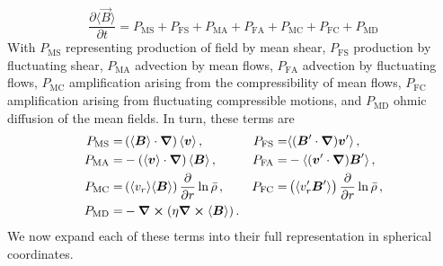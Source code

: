 \begin{equation}
  \label{eq:mean induction}
  \frac{\partial \langle \vec{B} \rangle }{\partial t} = P_\mathrm{MS} + P_\mathrm{FS} 
                                      + P_\mathrm{MA} + P_\mathrm{FA} 
				      + P_\mathrm{MC} + P_\mathrm{FC}
                                      + P_\mathrm{MD}
\end{equation}
With $P_\mathrm{MS}$ representing production of field by mean shear,
     $P_\mathrm{FS}$ production by fluctuating shear,
     $P_\mathrm{MA}$ advection by mean flows, 
     $P_\mathrm{FA}$ advection by fluctuating flows, 
     $P_\mathrm{MC}$ amplification arising from the compressibility of
     mean flows, $P_\mathrm{FC}$ amplification arising from
     fluctuating compressible motions, and 
     $P_\mathrm{MD}$ ohmic diffusion of the mean fields.  In turn,
     these terms are
\begin{align}\label{eq:mean terms}
  P_\mathrm{MS} =& \left( \langle \BB \rangle \cdot\nab \right)\langle \VV \rangle\thinspace, & %
  P_\mathrm{FS} =& \langle (\vec{B}'\cdot\nab)\vec{v}' \rangle\thinspace, \notag \\
  P_\mathrm{MA} =& -\left( \langle \VV \rangle \cdot\nab \right) \langle \BB \rangle\thinspace,& %
  P_\mathrm{FA} =& -\langle (\vec{v}'\cdot\nab)\vec{B}'  \rangle\thinspace,   \\   \label{eq:mean terms}
  P_\mathrm{MC} =&  \left( \langle v_r \rangle \langle \BB \rangle \right)\frac{\p}{\p r}\ln \rb\thinspace, & %
  P_\mathrm{FC} =&  \left( \langle v_r' \vec{B}' \rangle \right)\frac{\p}{\p r}\ln \rb\thinspace, \notag\\
  P_\mathrm{MD} =& -\nab\cross(\eta\nab\cross \langle \BB \rangle)\thinspace. & &\notag
\end{align}
We now expand each of these terms into their full representation in spherical coordinates.

